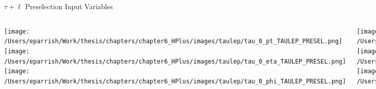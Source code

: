 \documentclass[aspectratio=169,xcolor=table]{beamer}
\begin{document}
    \begin{frame}[t]{$\tau+\ell$ Preselection Input Variables}
      \begin{columns}[t]
          \texttt{[image: /Users/eparrish/Work/thesis/chapters/chapter6\_HPlus/images/taulep/tau\_0\_pt\_TAULEP\_PRESEL.png]}
          \texttt{[image: /Users/eparrish/Work/thesis/chapters/chapter6\_HPlus/images/taulep/tau\_0\_eta\_TAULEP\_PRESEL.png]}
          \texttt{[image: /Users/eparrish/Work/thesis/chapters/chapter6\_HPlus/images/taulep/tau\_0\_phi\_TAULEP\_PRESEL.png]}

          \texttt{[image: /Users/eparrish/Work/thesis/chapters/chapter6\_HPlus/images/taulep/met\_et\_TAULEP\_PRESEL.png]}
          \texttt{[image: /Users/eparrish/Work/thesis/chapters/chapter6\_HPlus/images/taulep/met\_phi\_TAULEP\_PRESEL.png]}
          \texttt{[image: /Users/eparrish/Work/thesis/chapters/chapter6\_HPlus/images/taulep/jet\_1\_pt\_TAULEP\_PRESEL.png]}

          \texttt{[image: /Users/eparrish/Work/thesis/chapters/chapter6\_HPlus/images/taulep/bjet\_0\_pt\_TAULEP\_PRESEL.png]}
          \texttt{[image: /Users/eparrish/Work/thesis/chapters/chapter6\_HPlus/images/taulep/bjet\_0\_eta\_TAULEP\_PRESEL.png]}
          \texttt{[image: /Users/eparrish/Work/thesis/chapters/chapter6\_HPlus/images/taulep/bjet\_0\_phi\_TAULEP\_PRESEL.png]}

          \texttt{[image: /Users/eparrish/Work/thesis/chapters/chapter6\_HPlus/images/taulep/tau\_0\_upsilon\_TAULEP\_PRESEL.png]}
          \texttt{[image: /Users/eparrish/Work/thesis/chapters/chapter6\_HPlus/images/taulep/tau\_0\_charged\_tracks\_0\_pt\_TAULEP\_PRESEL.png]}

      \end{columns}
    \end{frame}
\end{document}
